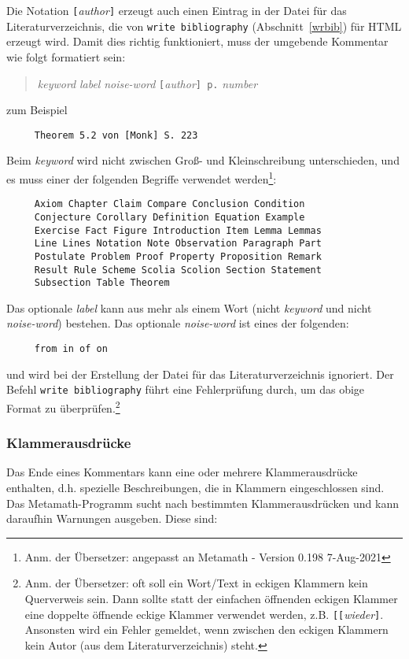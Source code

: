 Die Notation \texttt{[}{\em author}\texttt{]} erzeugt auch einen Eintrag in der Datei für das Literaturverzeichnis, die von \texttt{write bibliography} (Abschnitt~\ref{wrbib}) für {\sc HTML} erzeugt wird. Damit dies richtig funktioniert, muss der umgebende Kommentar wie folgt formatiert sein:
\begin{quote}
    {\em keyword} {\em label} {\em noise-word}
     \texttt{[}{\em author}\texttt{] p.} {\em number}
\end{quote}
zum Beispiel
\begin{verbatim}
     Theorem 5.2 von [Monk] S. 223
\end{verbatim}
Beim {\em keyword} wird nicht zwischen Groß- und Kleinschreibung unterschieden, und es muss einer der folgenden Begriffe verwendet werden\footnote{Anm. der Übersetzer: angepasst an Metamath - Version 0.198 7-Aug-2021}:
\begin{verbatim}    
     Axiom Chapter Claim Compare Conclusion Condition
     Conjecture Corollary Definition Equation Example
     Exercise Fact Figure Introduction Item Lemma Lemmas
     Line Lines Notation Note Observation Paragraph Part
     Postulate Problem Proof Property Proposition Remark
     Result Rule Scheme Scolia Scolion Section Statement
     Subsection Table Theorem
\end{verbatim}
Das optionale {\em label} kann aus mehr als einem Wort (nicht {\em keyword} und nicht {\em noise-word}) bestehen. Das optionale {\em noise-word} ist eines der folgenden:
\begin{verbatim}
     from in of on
\end{verbatim}
und wird bei der Erstellung der Datei für das Literaturverzeichnis ignoriert.  Der Befehl \texttt{write biblio\-graphy} führt eine Fehlerprüfung durch, um das obige Format zu überprüfen.\footnote{Anm. der Übersetzer: oft soll ein Wort/Text in eckigen Klammern kein Querverweis sein. Dann sollte statt der einfachen öffnenden eckigen Klammer eine doppelte öffnende eckige Klammer verwendet werden, z.B. \texttt{[}\texttt{[}{\em wieder}\texttt{]}. Ansonsten wird ein Fehler gemeldet, wenn zwischen den eckigen Klammern kein Autor (aus dem Literaturverzeichnis) steht.}

\subsubsection{Klammerausdrücke}\label{parentheticals}

Das Ende eines Kommentars kann eine oder mehrere Klammerausdrücke enthalten, d.h. spezielle Beschreibungen, die in Klammern eingeschlossen sind. Das Metamath-Programm sucht nach bestimmten Klammerausdrücken und kann daraufhin Warnungen ausgeben. Diese sind:

